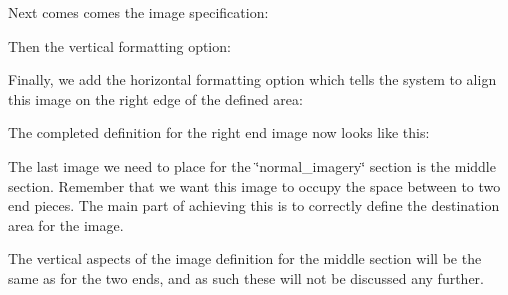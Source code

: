 Next comes comes the image specification\+: 
\begin{DoxyCode}{0}
\end{DoxyCode}


Then the vertical formatting option\+: 
\begin{DoxyCode}{0}
\end{DoxyCode}


Finally, we add the horizontal formatting option which tells the system to align this image on the right edge of the defined area\+: 
\begin{DoxyCode}{0}
\end{DoxyCode}


The completed definition for the right end image now looks like this\+: 
\begin{DoxyCode}{0}
\DoxyCodeLine{}
\DoxyCodeLine{}
\DoxyCodeLine{}
\end{DoxyCode}


The last image we need to place for the \char`\"{}normal\+\_\+imagery\char`\"{} section is the middle section. Remember that we want this image to occupy the space between to two end pieces. The main part of achieving this is to correctly define the destination area for the image.

The vertical aspects of the image definition for the middle section will be the same as for the two ends, and as such these will not be discussed any further.

